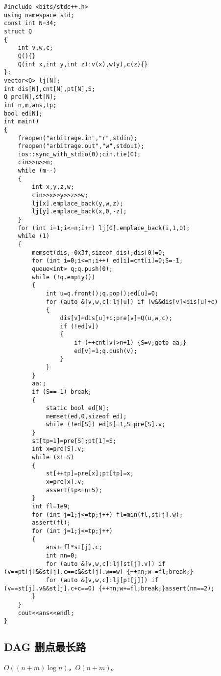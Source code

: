 \documentclass{ctexart}
\begin{document}
\begin{lstlisting}
#include <bits/stdc++.h>
using namespace std;
const int N=34;
struct Q
{
	int v,w,c;
	Q(){}
	Q(int x,int y,int z):v(x),w(y),c(z){}
};
vector<Q> lj[N];
int dis[N],cnt[N],pt[N],S;
Q pre[N],st[N];
int n,m,ans,tp;
bool ed[N];
int main()
{
	freopen("arbitrage.in","r",stdin);
	freopen("arbitrage.out","w",stdout);
	ios::sync_with_stdio(0);cin.tie(0);
	cin>>n>>m;
	while (m--)
	{
		int x,y,z,w;
		cin>>x>>y>>z>>w;
		lj[x].emplace_back(y,w,z);
		lj[y].emplace_back(x,0,-z);
	}
	for (int i=1;i<=n;i++) lj[0].emplace_back(i,1,0);
	while (1)
	{
		memset(dis,-0x3f,sizeof dis);dis[0]=0;
		for (int i=0;i<=n;i++) ed[i]=cnt[i]=0;S=-1;
		queue<int> q;q.push(0);
		while (!q.empty())
		{
			int u=q.front();q.pop();ed[u]=0;
			for (auto &[v,w,c]:lj[u]) if (w&&dis[v]<dis[u]+c)
			{
				dis[v]=dis[u]+c;pre[v]=Q(u,w,c);
				if (!ed[v])
				{
					if (++cnt[v]>n+1) {S=v;goto aa;}
					ed[v]=1;q.push(v);
				}
			}
		}
		aa:;
		if (S==-1) break;
		{
			static bool ed[N];
			memset(ed,0,sizeof ed);
			while (!ed[S]) ed[S]=1,S=pre[S].v;
		}
		st[tp=1]=pre[S];pt[1]=S;
		int x=pre[S].v;
		while (x!=S)
		{
			st[++tp]=pre[x];pt[tp]=x;
			x=pre[x].v;
			assert(tp<=n+5);
		}
		int fl=1e9;
		for (int j=1;j<=tp;j++) fl=min(fl,st[j].w);
		assert(fl);
		for (int j=1;j<=tp;j++)
		{
			ans+=fl*st[j].c;
			int nn=0;
			for (auto &[v,w,c]:lj[st[j].v]) if (v==pt[j]&&st[j].c==c&&st[j].w==w) {++nn;w-=fl;break;}
			for (auto &[v,w,c]:lj[pt[j]]) if (v==st[j].v&&st[j].c+c==0) {++nn;w+=fl;break;}assert(nn==2);
		}
	}
	cout<<ans<<endl;
}
\end{lstlisting}



\subsection{DAG 删点最长路}

$O((n+m)\log n)$，$O(n+m)$。
\end{document}
